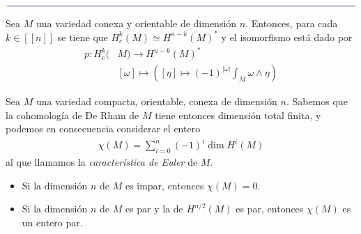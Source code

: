 \documentclass[11pt]{article}
\newcommand{\nat}[1]{[\![#1]\!]}
\newcommand{\paint}[1]{\color{color}{#1}}
\newcommand{\paintline}{\begin{center}
$\paint{
\rule{400pt}{0.5pt}
}$
\vspace{10pt}
\end{center}}
\newenvironment{theorem}[2][Teorema]{\begin{trivlist}
\item[\hskip \labelsep \paint{{\bfseries #1}}\hskip \labelsep {\bfseries #2.}]}{\end{trivlist}}
\newenvironment{exercise}[2][Ejercicio]{\begin{trivlist}
\item[\hskip \labelsep \paint{{\bfseries #1}}\hskip \labelsep {\bfseries #2.}]}{\end{trivlist}}
\begin{document}
\paintline
\hspace{25pt}
\begin{tcolorbox}
\begin{theorem}{5 (dualidad de Poincaré)} Sea $M$ una variedad conexa y orientable de dimensión $n$. Entonces, para cada $k \in \nat{n}$ se tiene que $H_c^k(M) \simeq H^{n-k}(M)^*$ y el isomorfismo está dado por
\begin{align*}
p : H_c^k(&M) \longrightarrow H^{n-k}(M)^*\\
&[\omega] \mapsto \left([\eta] \mapsto (-1)^{|\omega|}\int_M \omega \wedge \eta\right)
\end{align*}
\end{theorem}
\end{tcolorbox}
\newpage
\begin{exercise}{4} Sea $M$ una variedad compacta, orientable, conexa de dimensión $n$. Sabemos que la cohomología de De Rham de $M$ tiene entonces dimensión total finita, y podemos en consecuencia considerar el entero
\begin{align*}
\chi(M) = \sum_{i=0}^{n}(-1)^i \dim H^i(M)
\end{align*}
al que llamamos la \textit{característica de Euler} de $M$.
\begin{itemize}[listparindent = \parindent]
\item[(a)] Si la dimensión $n$ de $M$ es impar, entonces $\chi(M) = 0$.
\item[(b)] Si la dimensión $n$ de $M$ es par y la de $H^{n/2}(M)$ es par, entonces $\chi(M)$ es un entero par.
\end{itemize}
\end{exercise}
\end{document}
